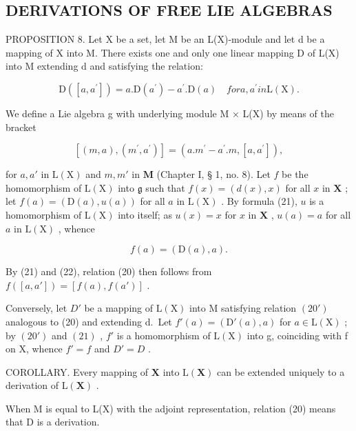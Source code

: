 \subsection{DERIVATIONS OF FREE LIE ALGEBRAS}

PROPOSITION 8. Let X be a set, let M be an L(X)-module and let d be a mapping of X into M. There exists one and only one linear mapping D of L(X) into M extending d and satisfying the relation:

\[
\mathrm{D} ([ a, a ^ {\prime} ]) = a. \mathrm{D} (a ^ {\prime}) - a ^ {\prime}. \mathrm{D} (a) \quad for a, a ^ {\prime} in \mathrm{L} (\mathrm{X}).\tag{20}
\]

We define a Lie algebra g with underlying module M × L(X) by means of the bracket

\[
[ (m, a), (m ^ {\prime}, a ^ {\prime}) ] = (a. m ^ {\prime} - a ^ {\prime}. m, [ a, a ^ {\prime} ]),\tag{21}
\]

for \(a, a'\) in \(\mathrm{L}(\mathrm{X})\) and \(m, m'\) in \(\mathbf{M}\) (Chapter I, § 1, no. 8). Let \(f\) be the homomorphism of \(\mathrm{L}(\mathrm{X})\) into \(\mathfrak{g}\) such that \(f(x) = (d(x), x)\) for all \(x\) in \(\mathbf{X}\) ; let \(f(a) = (\mathrm{D}(a), u(a))\) for all \(a\) in \(\mathrm{L}(\mathrm{X})\) . By formula (21), \(u\) is a homomorphism of \(\mathrm{L}(\mathrm{X})\) into itself; as \(u(x) = x\) for \(x\) in \(\mathbf{X}\) , \(u(a) = a\) for all \(a\) in \(\mathrm{L}(\mathrm{X})\) , whence

\[
f (a) = (\mathrm{D} (a), a).\tag{22}
\]

By (21) and (22), relation (20) then follows from \(f([a, a']) = [f(a), f(a')]\) .

Conversely, let \(D'\) be a mapping of \(\mathrm{L}(\mathrm{X})\) into M satisfying relation \((20')\) analogous to (20) and extending d.~Let \(f'(a) = (\mathrm{D}'(a), a)\) for \(a \in \mathrm{L}(\mathrm{X})\) ; by \((20')\) and \((21)\) , \(f'\) is a homomorphism of \(\mathrm{L}(\mathrm{X})\) into g, coinciding with f on X, whence \(f' = f\) and \(D' = D\) .

COROLLARY. Every mapping of \(\mathbf{X}\) into \(\mathrm{L}(\mathbf{X})\) can be extended uniquely to a derivation of \(\mathrm{L}(\mathbf{X})\) .

When M is equal to L(X) with the adjoint representation, relation (20) means that D is a derivation.

